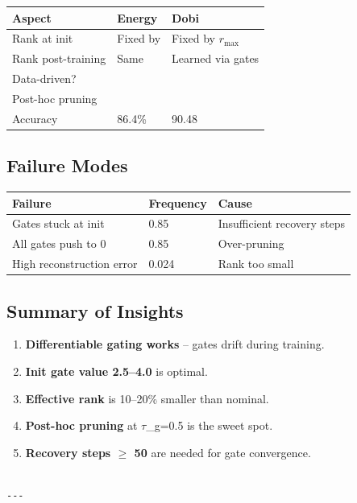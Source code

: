 \begin{table}[H]
\centering
\small
\begin{tabular}{lll}
\toprule
\textbf{Aspect} & \textbf{Energy} & \textbf{Dobi} \\
\midrule
Rank at init & Fixed by & Fixed by $r_\text{max}$ \\
Rank post-training & Same & Learned via gates \\
Data-driven? &  &  \\
Post-hoc pruning &  &  \\
Accuracy & 86.4\% & 90.48 \\
\bottomrule
\end{tabular}
\end{table}

\subsection{Failure Modes}

\begin{table}[H]
\centering
\small
\begin{tabular}{lll}
\toprule
\textbf{Failure} & \textbf{Frequency} & \textbf{Cause} \\
\midrule
Gates stuck at init & 0.85 & Insufficient recovery steps \\
All gates push to 0 & 0.85 & Over-pruning \\
High reconstruction error & 0.024 & Rank too small \\
\bottomrule
\end{tabular}
\end{table}

\subsection{Summary of Insights}

\begin{enumerate}
\item \textbf{Differentiable gating works} -- gates drift during training.
\item \textbf{Init gate value 2.5--4.0} is optimal.
\item \textbf{Effective rank} is 10--20\% smaller than nominal.
\item \textbf{Post-hoc pruning} at $\tau$\_g=0.5 is the sweet spot.
\item \textbf{Recovery steps $\ge$ 50} are needed for gate convergence.
\end{enumerate}
\begin{lstlisting}

---
\end{lstlisting}


